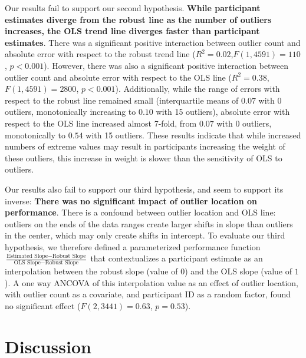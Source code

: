\documentclass{sigchi}
\begin{document}
Our results fail to support our second hypothesis. \textbf{While participant estimates diverge from the robust line as the number of outliers increases, the OLS trend line diverges faster than participant estimates}. There was a significant positive interaction between outlier count and absolute error with respect to the robust trend line ($R^2 = 0.02$,$F(1,4591)=110$, $p<0.001$). However, there was also a significant positive interaction between outlier count and absolute error with respect to the OLS line  ($R^2 = 0.38$,$F(1,4591)=2800$, $p<0.001$). Additionally, while the range of errors with respect to the robust line remained small (interquartile means of $0.07$ with 0 outliers, monotonically increasing to $0.10$ with 15 outliers), absolute error with respect to the OLS line increased almost 7-fold, from $0.07$ with 0 outliers, monotonically to $0.54$ with 15 outliers. These results indicate that while increased numbers of extreme values may result in participants increasing the weight of these outliers, this increase in weight is slower than the sensitivity of OLS to outliers.
	
Our results also fail to support our third hypothesis, and seem to support its inverse: \textbf{There was no significant impact of outlier location on performance}. There is a confound between outlier location and OLS line: outliers on the ends of the data ranges create larger shifts in slope than outliers in the center, which may only create shifts in intercept. To evaluate our third hypothesis, we therefore defined a parameterized performance function $\frac{\text{Estimated Slope}-\text{Robust Slope}}{\text{OLS Slope} - \text{Robust Slope}}$ that contextualizes a participant estimate as an interpolation between the robust slope (value of $0$) and the OLS slope (value of $1$). A one way ANCOVA of this interpolation value as an effect of outlier location, with outlier count as a covariate, and participant ID as a random factor, found no significant effect ($F(2,3441)=0.63$, $p=0.53$). 


\section{Discussion}
\end{document}
